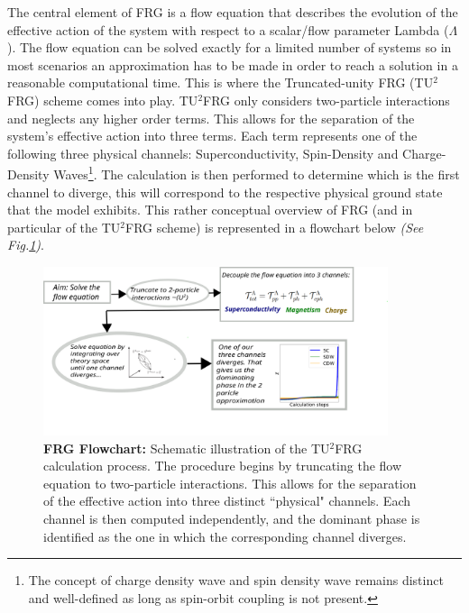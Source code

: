 \documentclass[11pt]{article}
\begin{document}
\noindent  The central element of FRG is a flow equation that describes the evolution of the effective action of the system with respect to a scalar/flow parameter Lambda ($\Lambda$).
The flow equation can be solved exactly for a limited number of systems so in most scenarios an approximation has to be made in order to reach a solution in a reasonable computational time.  
This is where the Truncated-unity FRG (TU$^2$FRG) scheme comes into play. TU$^2$FRG only considers two-particle
interactions and neglects any higher order terms.
This allows for the separation of the system's effective action into three terms. Each term represents one of the following three physical channels: Superconductivity, Spin-Density and Charge-Density Waves\footnote{The concept of charge density wave and spin density wave remains distinct and well-defined as long as spin-orbit coupling is not present.}.
The calculation is then performed to determine which is the first channel to diverge, this will correspond to the respective physical ground state that the model exhibits. This rather conceptual overview of FRG (and in particular of the TU$^2$FRG scheme) is represented in a flowchart below \textit{(See Fig.\ref{fig:FRGflowdiagram})}.
 

\begin{figure}[htbp]  %
    \centering
    \includegraphics[width=0.9\textwidth]{FRGflowdiagram.png}  %
    \caption{\textbf{FRG Flowchart:} Schematic illustration of the TU$^2$FRG calculation process.
     The procedure begins by truncating the flow equation to two-particle interactions. 
     This allows for the separation of the effective action into three distinct ``physical" channels. 
     Each channel is then computed independently, and the dominant phase is identified as the 
     one in which the corresponding channel diverges.}
    \label{fig:FRGflowdiagram}
\end{figure}
\end{document}
